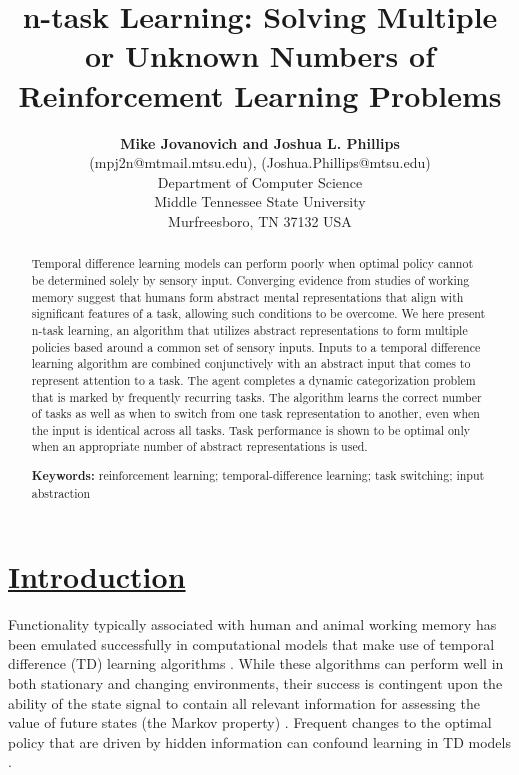 \documentclass[10pt,letterpaper]{article}
\title{n-task Learning: Solving Multiple or Unknown Numbers of Reinforcement Learning Problems}
\author{{\large \bf Mike Jovanovich and Joshua L. Phillips} \\ 
  (mpj2n@mtmail.mtsu.edu), (Joshua.Phillips@mtsu.edu) \\
  Department of Computer Science \\
  Middle Tennessee State University \\
  Murfreesboro, TN 37132 USA}
\begin{document}
\maketitle

\begin{abstract}
Temporal difference learning models can perform poorly when optimal policy cannot be determined solely by sensory input. Converging evidence from studies of working memory suggest that humans form abstract mental representations that align with significant features of a task, allowing such conditions to be overcome. We here present n-task learning, an algorithm that utilizes abstract representations to form multiple policies based around a common set of sensory inputs. Inputs to a temporal difference learning algorithm are combined conjunctively with an abstract input that comes to represent attention to a task. The agent completes a dynamic categorization problem that is marked by frequently recurring tasks. The algorithm learns the correct number of tasks as well as when to switch from one task representation to another, even when the input is identical across all tasks. Task performance is shown to be optimal only when an appropriate number of abstract representations is used.

\textbf{Keywords:} 
reinforcement learning; temporal-difference learning; task switching; input abstraction

\end{abstract}

\section{\underline{Introduction}}

Functionality typically associated with human and animal working memory has been emulated successfully in computational models that make use of temporal difference (TD) learning algorithms \cite{oreilly_prefrontal_2002,oreilly_making_2006,oreilly_biologically_2006,frank_interactions_2001,kriete_generalisation_2011,kriete_indirection_2013,niv_reinforcement_2015,rougier_prefrontal_2005,phillips_biologically_2005,phillips_working_2006}. While these algorithms can perform well in both stationary and changing environments, their success is contingent upon the ability of the state signal to contain all relevant information for assessing the value of future states (the Markov property) \cite{sutton_reinforcement_1998}. Frequent changes to the optimal policy that are driven by hidden information can confound learning in TD models \cite{sutton_between_1999}.
\end{document}
